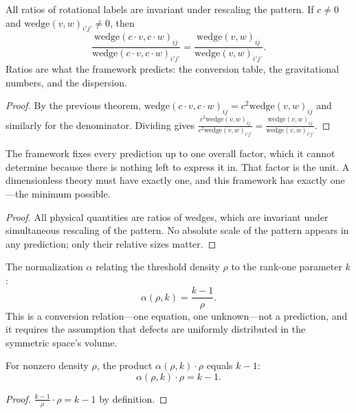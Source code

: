 \begin{theorem}
All ratios of rotational labels are invariant under rescaling the pattern. If $c \neq 0$ and $\text{wedge}(v,w)_{i'j'} \neq 0$, then
\[\frac{\text{wedge}(c \cdot v, c \cdot w)_{ij}}{\text{wedge}(c \cdot v, c \cdot w)_{i'j'}} = \frac{\text{wedge}(v, w)_{ij}}{\text{wedge}(v, w)_{i'j'}}.\]
Ratios are what the framework predicts: the conversion table, the gravitational numbers, and the dispersion.
\end{theorem}
\begin{proof}
By the previous theorem, $\text{wedge}(c \cdot v, c \cdot w)_{ij} = c^2 \text{wedge}(v, w)_{ij}$ and similarly for the denominator.
Dividing gives $\frac{c^2 \text{wedge}(v, w)_{ij}}{c^2 \text{wedge}(v, w)_{i'j'}} = \frac{\text{wedge}(v, w)_{ij}}{\text{wedge}(v, w)_{i'j'}}$.
\end{proof}

\begin{theorem}
The framework fixes every prediction up to one overall factor, which it cannot determine because
there is nothing left to express it in. That factor is the unit. A dimensionless theory must have exactly one,
and this framework has exactly one—the minimum possible.
\end{theorem}
\begin{proof}
All physical quantities are ratios of wedges, which are invariant under simultaneous rescaling of the pattern.
No absolute scale of the pattern appears in any prediction; only their relative sizes matter.
\end{proof}

\begin{definition}
The normalization $\alpha$ relating the threshold density $\rho$ to the rank-one parameter $k$:
\[\alpha(\rho, k) = \frac{k - 1}{\rho}.\]
This is a conversion relation—one equation, one unknown—not a prediction, and it requires the assumption
that defects are uniformly distributed in the symmetric space's volume.
\end{definition}

\begin{theorem}
For nonzero density $\rho$, the product $\alpha(\rho, k) \cdot \rho$ equals $k - 1$:
\[\alpha(\rho, k) \cdot \rho = k - 1.\]
\end{theorem}
\begin{proof}
$\frac{k-1}{\rho} \cdot \rho = k - 1$ by definition.
\end{proof}

